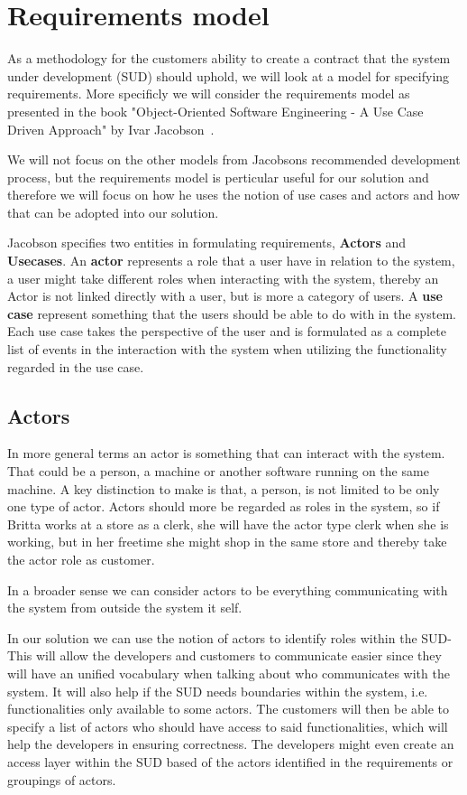 \section{Requirements model}

As a methodology for the customers ability to create a contract that the system under development (SUD) should uphold, we will look at a model for specifying requirements.
More specificly we will consider the requirements model as presented in the book "Object-Oriented Software Engineering - A Use Case Driven Approach" by Ivar Jacobson~\cite{Jacobson1992}.

We will not focus on the other models from Jacobsons recommended development process, but the requirements model is perticular useful for our solution and therefore we will focus on how he uses the notion of use cases and actors and how that can be adopted into our solution.

Jacobson specifies two entities in formulating requirements, \textbf{Actors} and \textbf{Usecases}.
An \textbf{actor} represents a role that a user have in relation to the system, a user might take different roles when interacting with the system, thereby an Actor is not linked directly with a user, but is more a category of users.
A \textbf{use case} represent something that the users should be able to do with in the system. Each use case takes the perspective of the user and is formulated as a complete list of events in the interaction with the system when utilizing the functionality regarded in the use case.

\subsection{Actors}
In more general terms an actor is something that can interact with the system. That could be a person, a machine or another software running on the same machine. 
A key distinction to make is that, a person, is not limited to be only one type of actor.
Actors should more be regarded as roles in the system, so if Britta works at a store as a clerk, she will have the actor type clerk when she is working, but in her freetime she might shop in the same store and thereby take the actor role as customer. 

In a broader sense we can consider actors to be everything communicating with the system from outside the system it self.

In our solution we can use the notion of actors to identify roles within the SUD- 
This will allow the developers and customers to communicate easier since they will have an unified vocabulary when talking about who communicates with the system. 
It will also help if the SUD needs boundaries within the system, i.e. functionalities only available to some actors.
The customers will then be able to specify a list of actors who should have access to said functionalities, which will help the developers in ensuring correctness.
The developers might even create an access layer within the SUD based of the actors identified in the requirements or groupings of actors.

